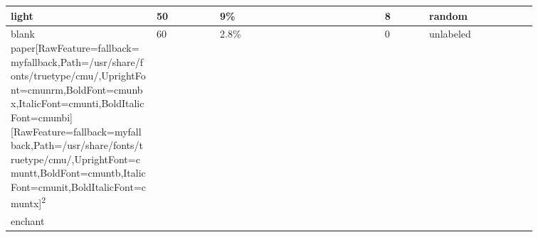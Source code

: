 \begin{longtable}{|>{\RaggedRight}p{0.23497\linewidth}|>{\RaggedRight}p{0.10823\linewidth}|>{\RaggedRight}p{0.26606\linewidth}|>{\RaggedRight}p{0.07394\linewidth}|>{\RaggedRight}p{0.17393\linewidth}|}
\hspace*{0pt}\ignorespaces{}\hspace*{0pt}light\footnotemark[23]&\hspace*{0pt}\ignorespaces{}\hspace*{0pt}50&\hspace*{0pt}\ignorespaces{}\hspace*{0pt}9\%&\hspace*{0pt}\ignorespaces{}\hspace*{0pt}8&\hspace*{0pt}\ignorespaces{}\hspace*{0pt}random\footnotemark[24]\\ \hline \hspace*{0pt}\ignorespaces{}\hspace*{0pt}blank paper\footnotemark[25]\allowbreak{}\setmainfont{cmunrm.ttf}[RawFeature={fallback=myfallback},Path=/usr/share/fonts/truetype/cmu/,UprightFont=cmunrm,BoldFont=cmunbx,ItalicFont=cmunti,BoldItalicFont=cmunbi]\setmonofont{cmunrm.ttf}[RawFeature={fallback=myfallback},Path=/usr/share/fonts/truetype/cmu/,UprightFont=cmuntt,BoldFont=cmuntb,ItalicFont=cmunit,BoldItalicFont=cmuntx]\textsuperscript{2}&\hspace*{0pt}\ignorespaces{}\hspace*{0pt}60&\hspace*{0pt}\ignorespaces{}\hspace*{0pt}2.8\%&\hspace*{0pt}\ignorespaces{}\hspace*{0pt}0&\hspace*{0pt}\ignorespaces{}\hspace*{0pt}unlabeled\\ \hline \hspace*{0pt}\ignorespaces{}\hspace*{0pt}enchant 
\end{longtable}
